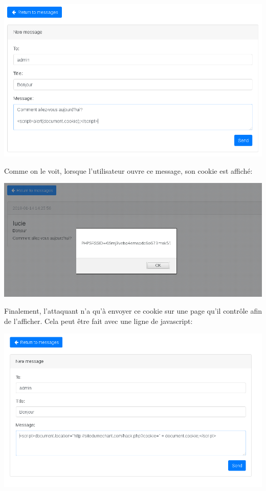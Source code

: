 \documentclass{article}
\begin{document}
\includegraphics[width=\textwidth]{images/xss3.png}

Comme on le voit, lorsque l'utilisateur ouvre ce message, son cookie est
affiché:

\includegraphics[width=\textwidth]{images/xss4.png}

Finalement, l'attaquant n'a qu'à envoyer ce cookie sur une page qu'il
contrôle afin de l'afficher. Cela peut être fait avec une ligne de
javascript:

\includegraphics[width=\textwidth]{images/xss5.png}
\end{document}
